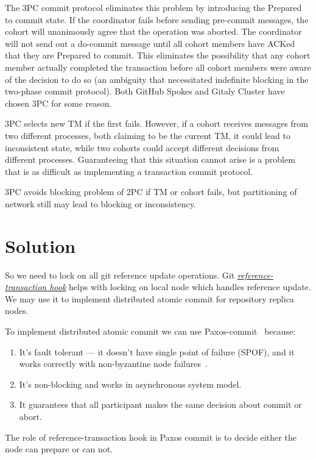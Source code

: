 \documentclass[sigplan, screen, nonacm, 11pt]{acmart}
\begin{document}
The 3PC commit protocol eliminates this problem by introducing the Prepared to commit state.
If the coordinator fails before sending pre-commit messages, the cohort will unanimously agree that the operation was aborted.
The coordinator will not send out a do-commit message until all cohort members have ACKed that they are Prepared to commit.
This eliminates the possibility that any cohort member actually completed the transaction before all cohort
members were aware of the decision to do so (an ambiguity that necessitated indefinite blocking
in the two-phase commit protocol). Both GitHub Spokes and Gitaly Cluster have chosen 3PC for some reason.

3PC selects new TM if the first fails.
However, if a cohort receives messages from two different processes,
both claiming to be the current TM, it could lead to inconsistent state,
while two cohorts could accept different decisions from different processes.
Guaranteeing that this situation cannot arise is a problem
that is as difficult as implementing a transaction commit protocol.

3PC avoids blocking problem of 2PC if TM or cohort fails,
but partitioning of network still may lead to blocking or inconsistency.


\section{Solution}

So we need to lock on all git reference update operations.
Git \emph{\href{https://git-scm.com/docs/githooks.html\#\_reference\_transaction}{reference-transaction hook}}
helps with locking on local node which handles reference update. We may use it to implement distributed atomic commit
for repository replica nodes.

To implement distributed atomic commit we can use Paxos-commit~\cite{paxos-commit} because:
\begin{enumerate}
  \item It's fault tolerant --- it doesn't have single point of failure (SPOF), and it works correctly with
    non-byzantine node failures~\cite{byzantine-generals}.
  \item It's non-blocking and works in asynchronous system model.
  \item It guarantees that all participant makes the same decision about commit or abort.
\end{enumerate}

The role of reference-transaction hook in Paxos commit is to decide either the node can prepare or can not.
\end{document}
